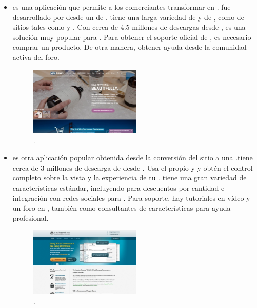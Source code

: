 \begin{itemize}
	\item \textbf{\nameWooCommerce} es una aplicación \ecommerce \freePC \openSourcePC que permite a los comerciantes transformar \wordPressNAME \sitesINT en \stores. \nameWooCommerce fue desarrollado por \wooThemes desde un \fork de \nameJigoshop. \nameWooCommerce tiene una larga variedad de  \plugins y  \themes de \wooThemes, como de sitios \thirdParty tales como \themeForest \cite{online_ThemeForest} y \codeCanyon \cite{online_CodeCanyon}. Con cerca de 4.5 millones de descargas desde \wordPressOrg\cite{online_WordPress}, \nameWooCommerce es una solución \ecommerce muy popular para \wordPressNAME. Para obtener el soporte oficial de \wooThemes, es necesario comprar un producto. De otra manera, obtener ayuda desde la comunidad activa del foro.

	\begin{figure}[H]
		\centering
		\includegraphics[width=0.5\textwidth]{figuras/cap1/WooCommerceWebsite.jpg}
		\caption{\nameWooCommerce \websiteINT \cite{online_WooCommerce}.}
	\end{figure}

	\item \textbf{\nameWPECommerce} es otra aplicación popular obtenida desde la conversión del  sitio \wordPressNAME a una \ecommerce \store.\nameWPECommerce tiene cerca de 3 millones de descarga de \plugin desde \wordPressOrg\cite{online_WordPress}. Usa el propio \htmlNAME y \cssNAME y obtén el control completo sobre la vista y la experiencia de tu \online \store. \nameWPECommerce tiene una gran variedad de características estándar, incluyendo \multiTierPricing para descuentos por cantidad e integración con redes sociales para \marketing. Para soporte, hay tutoriales en vídeo y un foro en \wordPressOrg, también como consultantes de características para ayuda profesional.

	\begin{figure}[H]
		\centering
		\includegraphics[width=0.5\textwidth]{figuras/cap1/WPECommerceWebsite.jpg}
		\caption{\nameWPECommerce \websiteINT \cite{online_WPECommerce}.}
	\end{figure}


\end{itemize}
